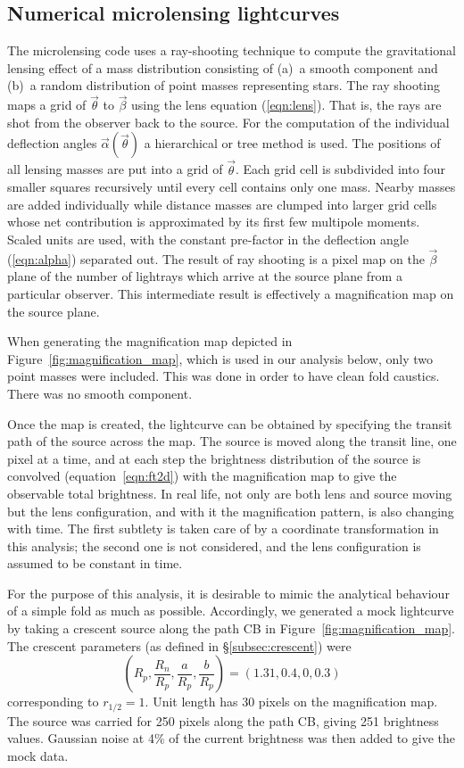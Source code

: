 \documentclass[usenatbib]{mn2e}
\begin{document}
\subsection{Numerical microlensing lightcurves}

The microlensing code uses a ray-shooting technique to compute the
gravitational lensing effect of a mass distribution consisting of
(a)~a smooth component and (b)~a random distribution of point masses
representing stars.  The ray shooting maps a grid of $\vec\theta$ to
$\vec\beta$ using the lens equation (\ref{eqn:lens}).  That is, the
rays are shot from the observer back to the source.  For the
computation of the individual deflection angles
$\vec\alpha(\vec\theta)$ a hierarchical or tree method is used.  The
positions of all lensing masses are put into a grid of $\vec\theta$.
Each grid cell is subdivided into four smaller squares recursively
until every cell contains only one mass.  Nearby masses are added
individually while distance masses are clumped into larger grid cells
whose net contribution is approximated by its first few multipole
moments.  Scaled units are used, with the constant pre-factor in the
deflection angle (\ref{eqn:alpha}) separated out.  The result of ray
shooting is a pixel map on the $\vec\beta$ plane of the number of
lightrays which arrive at the source plane from a particular observer.
This intermediate result is effectively a magnification map on the
source plane.

When generating the magnification map depicted in
Figure~\ref{fig:magnification_map}, which is used in our analysis
below, only two point masses were included.  This was done in order to
have clean fold caustics.  There was no smooth component.

Once the map is created, the lightcurve can be obtained by specifying
the transit path of the source across the map.  The source is moved
along the transit line, one pixel at a time, and at each step the
brightness distribution of the source is convolved
(equation~\ref{eqn:ft2d}) with the magnification map to give the
observable total brightness.  In real life, not only are both lens and
source moving but the lens configuration, and with it the
magnification pattern, is also changing with time.  The first subtlety
is taken care of by a coordinate transformation in this analysis; the
second one is not considered, and the lens configuration is assumed to
be constant in time.

For the purpose of this analysis, it is desirable to mimic the
analytical behaviour of a simple fold as much as possible.
Accordingly, we generated a mock lightcurve by taking a crescent
source along the path CB in Figure~\ref{fig:magnification_map}.  The
crescent parameters (as defined in \S\ref{subsec:crescent}) were
\begin{equation}
   \left(R_p, \frac{R_n}{R_p}, \frac{a}{R_p}, \frac{b}{R_p}\right) =
   (1.31, 0.4, 0, 0.3)
\label{eqn:cp}
\end{equation}
corresponding to $r_{1/2}=1$.  Unit length has 30 pixels on the
magnification map.  The source was carried for 250 pixels along the
path CB, giving 251 brightness values.  Gaussian noise at 4\% of the
current brightness was then added to give the mock data.
\end{document}
